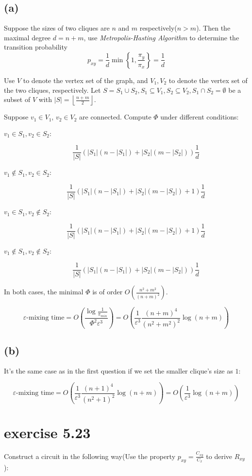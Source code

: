 \documentclass[paper=a4, fontsize=11pt]{scrartcl} %
\numberwithin{equation}{section} %
\numberwithin{figure}{section} %
\numberwithin{table}{section} %
\begin{document}
\subsection*{(a)}
Suppose the sizes of two cliques are $n$ and $m$ respectively($n > m$). Then the maximal degree $d = n + m$, use {\it Metropolis-Hasting Algorithm} to determine the transition probability $$p_{xy} = \frac{1}{d}\min\left\{1, \frac{\pi_y}{\pi_x}\right\} = \frac{1}{d}$$

Use $V$ to denote the vertex set of the graph, and $V_1, V_2$ to denote the vertex set of the two cliques, respectively. Let $S = S_1 \cup S_2, S_1 \subseteq V_1, S_2 \subseteq V_2, S_1 \cap S_2 = \emptyset$ be a subset of $V$ with $|S| = \left\lfloor \frac{n+m}{2} \right\rfloor$.

Suppose $v_1\in V_1$, $v_2\in V_2$ are connected. Compute $\Phi$ under different conditions:
\begin{description}
	\item[$v_1 \in S_1, v_2 \in S_2$:] $$\frac{1}{|S|} \left(|S_1|(n - |S_1|) + |S_2|(m - |S_2|)\right) \frac{1}{d}$$
	\item[$v_1 \not\in S_1, v_2 \in S_2$:] $$\frac{1}{|S|} \left(|S_1|(n - |S_1|) + |S_2|(m - |S_2|) + 1\right) \frac{1}{d}$$
	\item[$v_1 \in S_1, v_2 \not\in S_2$:] $$\frac{1}{|S|} \left(|S_1|(n - |S_1|) + |S_2|(m - |S_2|) + 1\right) \frac{1}{d}$$
	\item[$v_1 \not\in S_1, v_2 \not\in S_2$:] $$\frac{1}{|S|} \left(|S_1|(n - |S_1|)  + |S_2|(m - |S_2|)\right) \frac{1}{d}$$
\end{description}

In both cases, the minimal $\Phi$ is of order $O(\frac{n^2 + m^2}{(n+m)^2})$.

$$\varepsilon\textrm{-mixing time} =  O\left(\frac{\log \frac{1}{\pi_{min}}}{\Phi^2 \varepsilon^3}\right) = O\left(\frac{1}{\varepsilon^3}\frac{(n+m)^4}{(n^2 + m^2)^2} \log(n+m)\right)$$

\subsection*{(b)}
It's the same case as in the first question if we set the smaller clique's size as $1$:

$$\varepsilon\textrm{-mixing time} = O\left(\frac{1}{\varepsilon^3}\frac{(n+1)^4}{(n^2 + 1)^2} \log(n+m)\right) = O\left(\frac{1}{\varepsilon^3}\log(n+m)\right) $$
\section*{exercise 5.23}
Construct a circuit in the following way(Use the property $p_{xy} = \frac{C_{xy}}{C_x}$ to derive $R_{xy}$):
\end{document}
